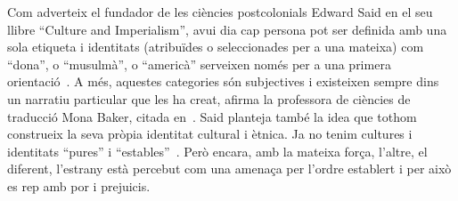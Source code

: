 Com adverteix el fundador de les ciències postcolonials Edward Said en el seu llibre ``Culture and Imperialism'', avui dia cap persona pot ser definida amb una sola etiqueta
i identitats (atribuïdes o seleccionades per a una mateixa) com ``dona'', o ``musulmà'', o ``americà'' serveixen només per a una primera orientació~\autocite{Vidal2012}.
A més, aquestes categories són subjectives i existeixen sempre dins un narratiu particular que les ha creat, afirma la professora de ciències de traducció Mona Baker, citada en~\autocite{Vidal2012}.
Said planteja també la idea que tothom construeix la seva pròpia identitat cultural i ètnica.
Ja no tenim cultures i identitats ``pures'' i ``estables''~\autocite{Vidal2012}.
Però encara, amb la mateixa força, l'altre, el diferent, l'estrany està percebut com una amenaça per l'ordre establert i per això es rep amb por i prejuicis.

\begin{comment}
  1) la cultura d'origen representada per
     * el pare
     * la mare
     * la família amb els avis i les tietes
     * els moros de Catalunya
  2) la cultura d'acollida, representada per
     * l'escola
     * les amigues
     * les amants del pare

+ stereotips mútuus de cada grup per l'altre
\end{comment}

